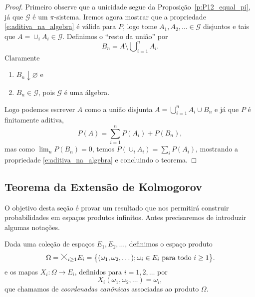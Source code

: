\documentclass[reqno, final]{book}
\newcommand*\1{\mathds{1}}
\DeclareMathOperator*{\mcup}{{\textstyle \bigcup}}
\newcommand*\bigtimes{\tikz[baseline=0, scale=.3]{
\draw[opacity=0] (-.1,-.1) rectangle (1.1, 1.1);
\draw[line width=.5pt] (0,0) -- (1,1) (1,0) -- (0,1);}
}
\begin{document}
\begin{proof}
  Primeiro observe que a unicidade segue da Proposição~\ref{p:P12_equal_pi}, já que $\mathcal{G}$ é um $\pi$-sistema.
  Iremos agora mostrar que a propriedade \eqref{e:aditiva_na_algebra} é válida para $P$, logo tome $A_1, A_2, \dots \in \mathcal{G}$ disjuntos e tais que $A = \cup_i A_i \in \mathcal{G}$.
  Definimos o ``resto da união'' por
  \begin{equation}
    B_n = A \setminus \mcup_{i=1}^n A_i.
  \end{equation}
  Claramente
  \begin{enumerate}[\quad a)]
  \item $B_n \downarrow \varnothing$ e
  \item $B_n \in \mathcal{G}$, pois $\mathcal{G}$ é uma álgebra.
  \end{enumerate}

  Logo podemos escrever $A$ como a união disjunta $A = \bigcup_{i=1}^n A_i \cup B_n$ e já que $P$ é finitamente aditiva,
  \begin{equation}
    P(A) = \sum_{i=1}^n P(A_i) + P(B_n),
  \end{equation}
  mas como $\lim_n P(B_n) = 0$, temos $P(\cup_i A_i) = \sum_i P(A_i)$, mostrando a propriedade \eqref{e:aditiva_na_algebra} e concluindo o teorema.
\end{proof}

\subsection{Teorema da Extensão de Kolmogorov}

O objetivo desta seção é provar um resultado que nos permitirá construir probabilidades em espaços produtos infinitos.
Antes precisaremos de introduzir algumas notações.

Dada uma coleção de espaços $E_1, E_2, \dots$, definimos o espaço produto
\begin{equation}
  \Omega = \bigtimes_{i\geq 1} E_i = \big\{(\omega_1, \omega_2, \dots); \omega_i \in E_i \text{ para todo $i \geq 1$}\big\}.
\end{equation}
e os mapas $X_i:\Omega \to E_i$, definidos para $i = 1, 2, \dots$ por
\begin{equation}
  X_i(\omega_1, \omega_2, \dots) = \omega_i,
\end{equation}
que chamamos de \emph{coordenadas canônicas}  associadas ao produto $\Omega$.
\end{document}
